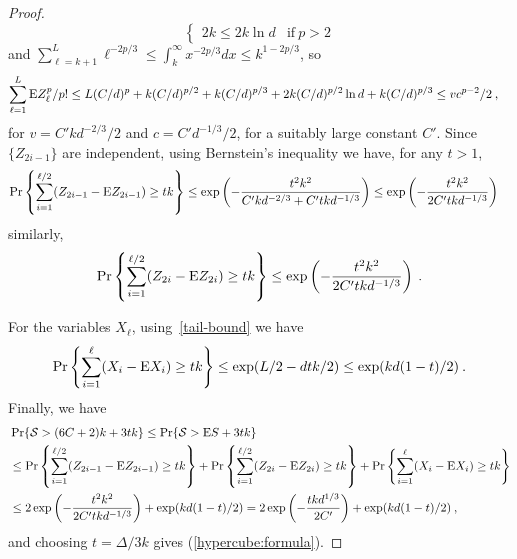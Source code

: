 \documentclass{patmorin}
\newcommand{\abas}[1]{\textcolor{orange}{\big[Abbas: #1\big]}}
\begin{document}
\begin{proof}
\[\begin{cases}
 2k \leq 2 k \ln d &  \mathrm{if\ }  p>2
\end{cases}
\]
 and 
$\sum_{\ell=k+1}^{L}\ell^{-2p/3} \leq 
\int_{k}^{\infty} x^{-2p/3} dx \leq
k^{1-2p/3}$, so
\begin{align*}
\sum_{\ell=1}^{L} \mathrm{E} Z_{\ell}^p / p!
&
\leq L (C/d)^{p}
+
k (C/d)^{p/2}
+ k(C/d)^{p/3} 
+
2k(C/d)^{p/2} \ln d
+
 k(C/d)^{p/3} \leq v c^{p-2}/2\:,
\end{align*}
for $v = C' k d^{-2/3}/2$ and
$c = C' d^{-1/3}/2$,
for a suitably large constant $C'$.
Since $\{Z_{2i-1}\}$ are independent, using Bernstein's inequality we have, for any $t>1$,
\begin{align*}
\Pr \left\{ \sum_{i=1}^{\ell/2} (Z_{2i-1} - \mathrm{E} Z_{2i-1}) 
\geq tk
\right\}&
\leq \exp\left(-\frac{t^2k^2}{C'kd^{-2/3} + C'tkd^{-1/3}}\right)
\leq
\exp\left(-\frac{t^2k^2}{2C'tkd^{-1/3}}\right)
\end{align*}
similarly,
\[
\Pr \left\{ \sum_{i=1}^{\ell/2} (Z_{2i} - \mathrm{E} Z_{2i}) 
\geq t k
\right\}\leq \exp\left(-\frac{t^2k^2}{ 2C'tkd^{-1/3}}\right)
\:.
\]

For the variables $X_{\ell}$, using~\eqref{tail-bound} we have
\[
\Pr \left\{ \sum_{i=1}^{\ell} (X_{i} - \mathrm{E} X_{i}) 
\geq tk
\right\}\leq
\exp(L/2-dtk/2)\leq
\exp(kd(1-t)/2)\:.
\]
Finally, we have
\begin{align*}
&\Pr\{\mathcal S > (6C+2)k+3tk \}
 \leq
\Pr\{\mathcal S > \mathrm{E} S + 3tk\} \\
& \leq
\Pr \left\{ \sum_{i=1}^{\ell/2} (Z_{2i-1} - \mathrm{E} Z_{2i-1}) 
\geq tk
\right\}
+
\Pr \left\{ \sum_{i=1}^{\ell/2} (Z_{2i} - \mathrm{E} Z_{2i}) 
\geq tk
\right\}
+
\Pr \left\{ \sum_{i=1}^{\ell} (X_{i} - \mathrm{E} X_{i}) 
\geq tk
\right\}\\
& \leq
2 \exp\left(-\frac{t^2k^2}{2C'tkd^{-1/3}}\right)+
\exp(kd(1-t)/2)
=
2 \exp\left(-\frac{tkd^{1/3}}{2C'}\right)+
\exp(kd(1-t)/2)
\:,
\end{align*}
and choosing $t = \Delta/3k$ gives (\ref{hypercube:formula}).
\end{proof}

\end{document}
